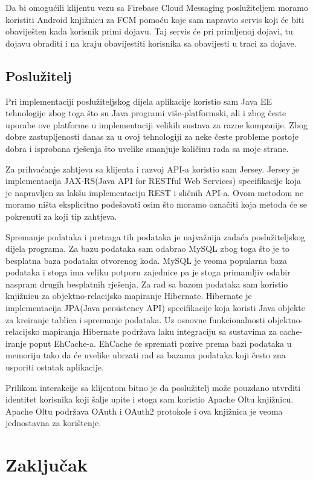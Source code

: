 \documentclass[times, utf8, zavrsni]{fer}
\begin{document}
Da bi omogućili klijentu vezu sa Firebase Cloud Messaging poslužiteljem moramo koristiti Android knjižnicu za FCM pomoću koje sam napravio servis koji će biti obaviješten kada korisnik primi dojavu. Taj servis će pri primljenoj dojavi, tu dojavu obraditi i na kraju obavijestiti korisnika sa obavijesti u traci za dojave.

\section{Poslužitelj}

Pri implementaciji poslužiteljskog dijela aplikacije koristio sam Java EE tehnologije zbog toga što su Java programi više-platformski, ali i zbog česte uporabe ove platforme u implementaciji velikih sustava za razne kompanije. Zbog dobre zastupljenosti danas za u ovoj tehnologiji za neke česte probleme postoje dobra i isprobana rješenja što uvelike smanjuje količinu rada sa moje strane.

Za prihvaćanje zahtjeva sa klijenta i razvoj API-a koristio sam Jersey. Jersey je implementacija JAX-RS(Java API for RESTful Web Services) specifikacije koja je napravljen za lakšu implementaciju REST i sličnih API-a. Ovom metodom ne moramo ništa eksplicitno podešavati osim što moramo označiti koja metoda će se pokrenuti za koji tip zahtjeva.

Spremanje podataka i pretraga tih podataka je najvažnija zadaća poslužiteljskog dijela programa. Za bazu podataka sam odabrao MySQL zbog toga što je to besplatna baza podataka otvorenog koda. MySQL je veoma popularna baza podataka i stoga ima veliku potporu zajednice pa je stoga primamljiv odabir naspram drugih besplatnih rješenja. Za rad sa bazom podataka sam koristio knjižnicu za objektno-relacijsko mapiranje Hibernate. Hibernate je implementacija JPA(Java persistency API) specifikacije koja koristi Java objekte za kreiranje tablica i spremanje podataka. Uz osnovne funkcionalnosti objektno-relacijsko mapiranja Hibernate podržava laku integraciju sa sustavima za cache-iranje poput EhCache-a. EhCache će spremati pozive prema bazi podataka u memoriju tako da će uvelike ubrzati rad sa bazama podataka koji često zna usporiti ostatak aplikacije.

Prilikom interakcije sa klijentom bitno je da poslužitelj može pouzdano utvrditi identitet korisnika koji šalje upite i stoga sam koristio Apache Oltu knjižnicu. Apache Oltu podržava OAuth i OAuth2 protokole i ova knjižnica je veoma jednostavna za korištenje.

\chapter{Zaključak}
\end{document}

